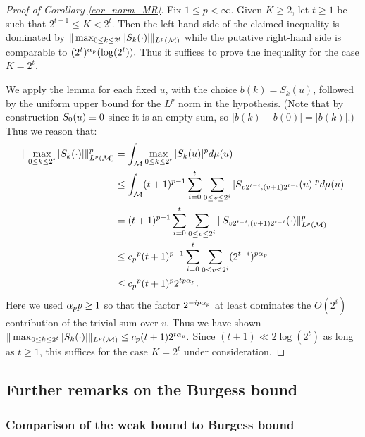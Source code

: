 \documentclass[oneside,11pt]{amsart}
\begin{document}
 \begin{proof}[Proof of Corollary \ref{cor_norm_MR}]
Fix $1 \leq p < \infty$. Given $K \geq 2$, let $t \geq 1$ be such that $2^{t-1} \leq K < 2^t$. Then the left-hand side of the claimed inequality is dominated by 
$ \| \max_{0 \leq k \leq 2^t} |S_k (\cdot) |\|_{L^p(\mathcal{M})}$ while the putative right-hand side is comparable to $(2^{t})^{\alpha_p} (\log (2^t)).$ Thus it suffices to prove the inequality for the case $K=2^t$.
 


 We apply the lemma for each fixed $u$, with the choice $b(k) = S_k(u)$, followed by the uniform upper bound for the $L^p$ norm in the hypothesis. (Note that by construction $S_0(u)\equiv 0$ since it is an empty sum, so $|b(k)-b(0)| = |b(k)|$.) Thus we reason that:
 \begin{align*}
  \| \max_{0 \leq k \leq 2^t} |S_k (\cdot) |\|_{L^p(\mathcal{M})}^p
 	& = \int_{\mathcal{M}} \max_{0 \leq k \leq 2^t} |S_k (u) |^p d\mu(u)\\
	& \leq \int_{\mathcal{M}} (t+1)^{p-1} \sum_{i=0}^t \sum_{0 \leq v \leq 2^i} |S_{v2^{t-i},(v+1)2^{t-i}}(u)|^p d\mu(u)\\
	&= (t+1)^{p-1} \sum_{i=0}^t \sum_{0 \leq v \leq 2^i} \|S_{v2^{t-i},(v+1)2^{t-i}}(\cdot)\|_{L^p(\mathcal{M})}^p\\
	&\leq {c_p}^p (t+1)^{p-1} \sum_{i=0}^t \sum_{0 \leq v \leq 2^i} (2^{t-i})^{p\alpha_p}\\
	& \leq {c_p}^p  (t+1)^{p}    2^{tp\alpha_p}.
	 \end{align*}
 Here we used $\alpha_p p \geq 1$ so that the  factor $2^{-ip\alpha_p}$ at least dominates the $O(2^i)$ contribution of the trivial sum over $v$.
Thus we have shown $  \| \max_{0 \leq k \leq 2^t} |S_k (\cdot) |\|_{L^p(\mathcal{M})} \leq c_p (t+1) 2^{t \alpha_p}.$ 
Since $(t+1) \ll 2\log (2^t)$  as long as $t \geq 1$,  this suffices for the case $K=2^t$ under consideration.

 \end{proof}
 
  
 
  

 
\subsection{Further remarks on the Burgess bound}\label{sec_remarks_Burgess}
  \subsubsection{Comparison of the weak bound to Burgess bound}\label{sec_compare_Burgess}
\end{document}
